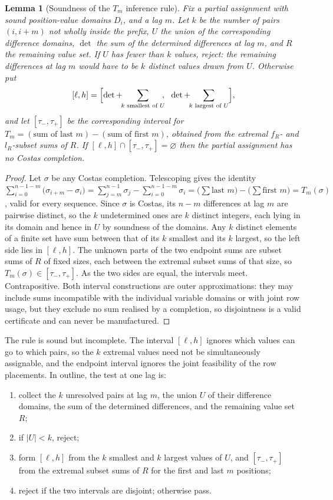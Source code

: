 \documentclass[11pt,a4paper,oneside]{report}
\newtheorem{lemma}[theorem]{Lemma}
\theoremstyle{definition}
\begin{document}
\begin{lemma}[Soundness of the $T_m$ inference rule]
\label{p5-lem:tmsound}
Fix a partial assignment with sound position-value domains $D_i$, and a lag $m$.
Let $k$ be the number of pairs $(i,i+m)$ not wholly inside the prefix, $U$ the
union of the corresponding difference domains, $\det$ the sum of the determined
differences at lag $m$, and $R$ the remaining value set. If $U$ has fewer than $k$ values, reject: the remaining
differences at lag $m$ would have to be $k$ distinct values drawn from $U$. Otherwise put
\[
[\ell,h]=\Bigl[\det+\!\!\sum_{k \text{ smallest of } U}\!\!,\ \
\det+\!\!\sum_{k \text{ largest of } U}\Bigr],
\]
and let $[\tau_-,\tau_+]$ be the corresponding interval for
$T_m=(\text{sum of last }m)-(\text{sum of first }m)$, obtained from the extremal
$f_R$- and $l_R$-subset sums of $R$. If $[\ell,h]\cap[\tau_-,\tau_+]=\varnothing$
then the partial assignment has no Costas completion.
\end{lemma}
\begin{proof}
Let $\sigma$ be any Costas completion. Telescoping gives the identity
$\sum_{i=0}^{n-1-m}\bigl(\sigma_{i+m}-\sigma_i\bigr)
=\sum_{j=m}^{n-1}\sigma_j-\sum_{i=0}^{n-1-m}\sigma_i
=\bigl(\textstyle\sum\text{last }m\bigr)-\bigl(\sum\text{first }m\bigr)=T_m(\sigma)$,
valid for every sequence. Since $\sigma$ is Costas, its $n-m$ differences at lag
$m$ are pairwise distinct, so the $k$ undetermined ones are $k$ distinct integers,
each lying in its domain and hence in $U$ by soundness of the domains. Any $k$
distinct elements of a finite set have sum between that of its $k$ smallest and
its $k$ largest, so the left side lies in $[\ell,h]$. The unknown parts of the two
endpoint sums are subset sums of $R$ of fixed sizes, each between the extremal
subset sums of that size, so $T_m(\sigma)\in[\tau_-,\tau_+]$. As the two sides are
equal, the intervals meet. Contrapositive. Both interval constructions are
outer approximations: they may include sums incompatible with the individual
variable domains or with joint row usage, but they exclude no sum realised by a
completion, so disjointness is a valid certificate and can never be manufactured.
\end{proof}

\noindent The rule is sound but incomplete. The interval $[\ell,h]$ ignores which values can go to
which pairs, so the $k$ extremal values need not be simultaneously assignable, and the endpoint
interval ignores the joint feasibility of the row placements. In outline, the test at one lag is:
\begin{enumerate}[nosep]
\item collect the $k$ unresolved pairs at lag $m$, the union $U$ of their difference domains, the sum
  of the determined differences, and the remaining value set $R$;
\item if $|U|<k$, reject;
\item form $[\ell,h]$ from the $k$ smallest and $k$ largest values of $U$, and $[\tau_-,\tau_+]$ from
  the extremal subset sums of $R$ for the first and last $m$ positions;
\item reject if the two intervals are disjoint; otherwise pass.
\end{enumerate}
\end{document}
